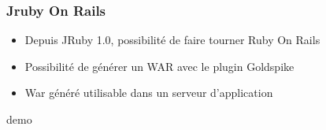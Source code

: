 \documentclass{beamer}
\begin{document}
\begin{frame}
    \frametitle{Jruby On Rails}
    \begin{itemize}
        \item Depuis JRuby 1.0, possibilité de faire tourner Ruby On Rails
        \item Possibilité de générer un WAR avec le plugin Goldspike
        \item War généré utilisable dans un serveur d'application
    \end{itemize}
\end{frame}

\begin{frame}
    \begin{center}
    \huge{}
    demo
    \end{center}
\end{frame}
\end{document}
